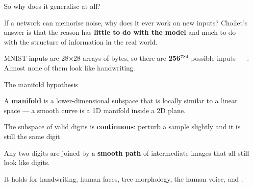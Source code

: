 \documentclass[aspectratio=169,11pt,t]{beamer}
\begin{document}
\begin{frame}[shrink=25]{So why does it generalise at all?}
{\fontsize{9.4}{12.6}\selectfont\color{fg2}If a network can memorise noise, why does it ever work on new inputs? Chollet's answer is that the reason has \textbf{little to do with the model} and much to do with the structure of information in the real world.\par}\vskip 4pt
\begin{iband}[signal]
MNIST inputs are 28$\times$28 arrays of bytes, so there are \textbf{256$^{7}$$^{8}$$^{4}$} possible inputs --- . Almost none of them look like handwriting.
\end{iband}
\end{frame}

\begin{frame}[shrink=25]{The manifold hypothesis}
\begin{iquote}
\end{iquote}
\begin{ibullets}
\item A \textbf{manifold} is a lower-dimensional subspace that is locally similar to a linear space --- a smooth curve is a 1D manifold inside a 2D plane.
\item The subspace of valid digits is \textbf{continuous}: perturb a sample slightly and it is still the same digit.
\item Any two digits are joined by a \textbf{smooth path} of intermediate images that all still look like digits.
\item It holds for handwriting, human faces, tree morphology, the human voice, and .
\end{ibullets}
\end{frame}
\end{document}
